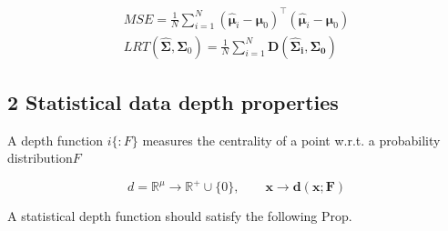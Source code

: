 \documentclass{article}
\begin{document}
\begin{equation}
\begin{array} { c } { M S E = \frac { 1 } { N } \sum _ { i = 1 } ^ { N } ( \hat { \boldsymbol { \mu } } _ { i } - \boldsymbol { \mu } _ { 0 } ) ^ { \top } ( \hat { \boldsymbol { \mu } } _ { i } - \boldsymbol { \mu } _ { 0 } ) } \\ { L R T ( \hat { \mathbf { \Sigma } }, \mathbf { \Sigma } _ { 0 } ) = \frac { 1 } { N } \sum _ { i = 1 } ^ { N } \mathbf { D ( \hat { \mathbf { \Sigma } } _ { i }, \mathbf { \Sigma } _ { 0 } ) } } \end{array}
\end{equation}


\subsection*{2 Statistical data depth properties}


A depth function $i \{ : F \}$ measures the centrality of a point w.r.t. a probability distribution$F$


\begin{equation}
d = \mathbb { R } ^ { \mu } \rightarrow \mathbb { R } ^ { + } \cup \{ 0 \}, \qquad \mathbf { x } \rightarrow \mathbf { d } ( \mathbf { x } ; \mathbf { F } )
\end{equation}


A statistical depth function should satisfy the following Prop.
\end{document}
